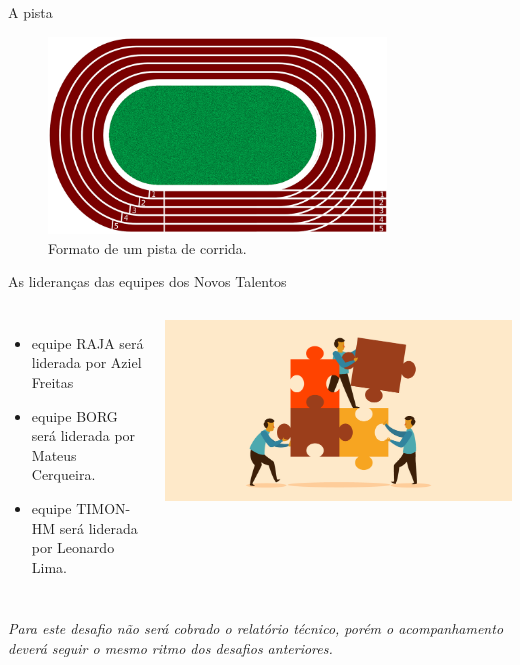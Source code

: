 \documentclass[aspectratio=169]{beamer}
\begin{document}
\begin{frame}[c]{A pista}
    \begin{figure}
        \includegraphics[width=0.8\textwidth]{pista_corrida}
        \caption{Formato de um pista de corrida.}
    \end{figure}
\end{frame}
\begin{frame}[t]{As lideranças das equipes dos Novos Talentos}
    \vspace{0.5cm}
    \begin{columns}
            \begin{itemize}
                \item equipe RAJA será liderada por Aziel Freitas
                \item equipe BORG será liderada por Mateus Cerqueira.
                \item equipe TIMON-HM será liderada por Leonardo Lima.
            \end{itemize}
            \includegraphics[width=.9\textwidth, trim={10cm 0 10cm 0},clip]{equipe}
    \end{columns}
    \vspace{1cm}
    
    \emph{Para este desafio não será cobrado o relatório técnico, porém o acompanhamento deverá seguir o mesmo ritmo dos desafios anteriores.}

\end{frame}
\end{document}
